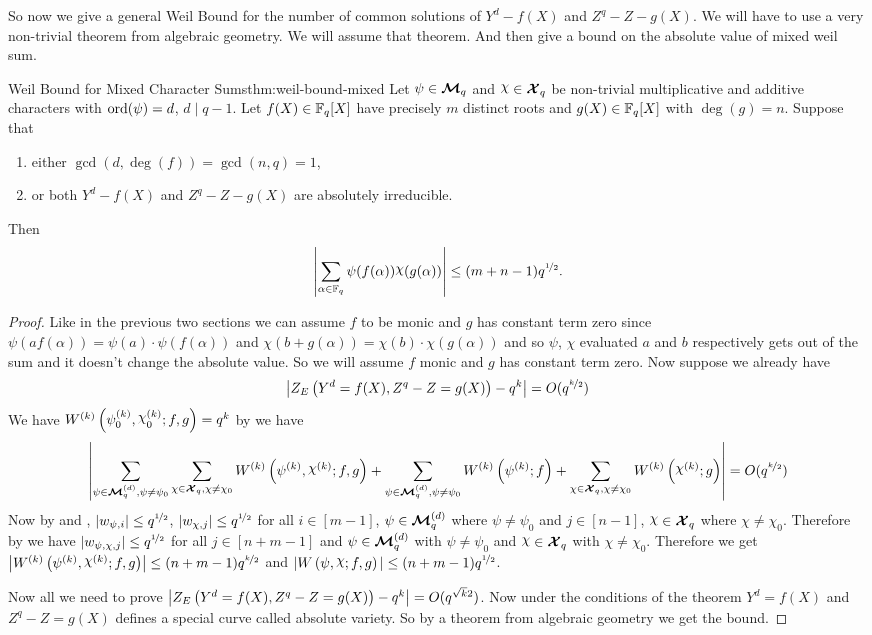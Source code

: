 So now we give a general Weil Bound for the number of common solutions of $Y^d-f(X)$ and $Z^q-Z-g(X)$. We will have to use a very non-trivial theorem  from algebraic geometry. We will assume that theorem. And then give a bound on the absolute value of mixed weil sum.
\begin{Theorem}{Weil Bound for Mixed Character Sums}{thm:weil-bound-mixed}
  Let $\psi\in\boldsymbol{\mathcal{M}}_q$ and $\chi\in\Xq$ be non-trivial multiplicative and additive characters with $\operatorname{ord}(\psi)=d$, $d\mid q-1$. Let $f(X)\in\mathbb{F}_q[X]$ have precisely $m$ distinct roots and $g(X)\in\mathbb{F}_q[X]$ with $\deg(g)=n$. Suppose that
  \begin{enumerate}[label=(\roman*)]
    \item either $\gcd(d,\deg(f))=\gcd(n,q)=1$,
    \item or both $Y^d-f(X)$ and $Z^q-Z-g(X)$ are absolutely irreducible.
  \end{enumerate}
  Then $$\lt|\sum_{\alpha\in\bbF_q}\psi(f(\alpha))\chi(g(\alpha))\rt|\leq (m+n-1)q^{\nicefrac{1}{2}}.$$
\end{Theorem}
\begin{proof}
  Like in the previous two sections we can assume $f$ to be monic and $g$ has constant term zero since $\psi(af(\alpha))=\psi(a)\cdot \psi(f(\alpha))$ and $\chi(b+g(\alpha))=\chi(b)\cdot \chi(g(\alpha))$ and so $\psi$, $\chi$ evaluated $a$ and $b$ respectively gets out of the sum and it doesn't change the absolute value. So we will assume $f$ monic and $g$ has constant term zero. Now suppose we already have $$\left|Z_E\left(Y^d=f(X), Z^q-Z=g(X)\right)-q^k\right|=O(q^{\nicefrac{k}2})$$We have  $W^{(k)}\lt(\psi_0^{(k)},\chi_0^{(k)};f,g\rt)=q^k$ by \JointSolCharSumlem we have $$\lt|\sum_{\psi\in\Mq^{(d)},\psi\neq \psi_0}\sum_{\oldchi\in\Xq,\oldchi\neq \oldchi_0}\Wmixl{k}{f}{g}+\sum_{\psi\in\Mq^{(d)},\psi\neq \psi_0}\Wpsil{k}{f}+\sum_{\oldchi\in\Xq,\oldchi\neq \oldchi_0}\Wchil{k}{g} \rt|=O(q^{\nicefrac{k}{2}})$$Now by \WeilRootsModulusChilem and \WeilRootsModuluslem, $|w_{\psi,i}|\leq q^{\nicefrac12}$, $|w_{\oldchi,j}|\leq q^{\nicefrac12}$ for all $i\in[m-1]$, $\psi\in\boldsymbol{\mathcal{M}}_q^{(d)}$ where $\psi\neq \psi_0$ and $j\in[n-1]$, $\chi\in\Xq$ where $\chi\neq \chi_0$. Therefore by \PowerSumBound we have $|w_{\psi,\oldchi,j}|\leq q^{\nicefrac{1}{2}}$ for all $j\in[n+m-1]$ and $\psi\in\boldsymbol{\mathcal{M}}_q^{(d)}$ with $\psi\neq \psi_0$ and $\chi\in\Xq$ with $\chi\neq \chi_0$. Therefore we get $\lt|\Wmixl{k}{f}{g}\rt|\leq (n+m-1)q^{\nicefrac{k}2}$ and $|\Wmix{f}{g}|\leq (n+m-1)q^{\nicefrac12}$. 

  Now all we need to prove $\left|Z_E\left(Y^d=f(X), Z^q-Z=g(X)\right)-q^k\right|=O(q^{\sqrt{k}2})$.
  Now under the conditions of the theorem $Y^d=f(X)$ and $Z^q-Z=g(X)$ defines a special curve called absolute variety. So by a theorem from algebraic geometry  we get the bound. 
\end{proof}

